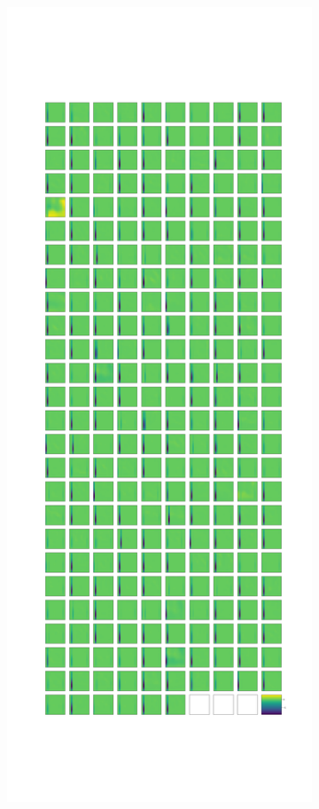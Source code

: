 \documentclass[11pt]{article}
\begin{document}
\begin{figure}
\begin{subfigure}{0.3\textwidth}
            \includegraphics[width=\textwidth]{images/stripes/leaky_re_lu_5.png}

\end{subfigure}
\end{figure}
\end{document}
